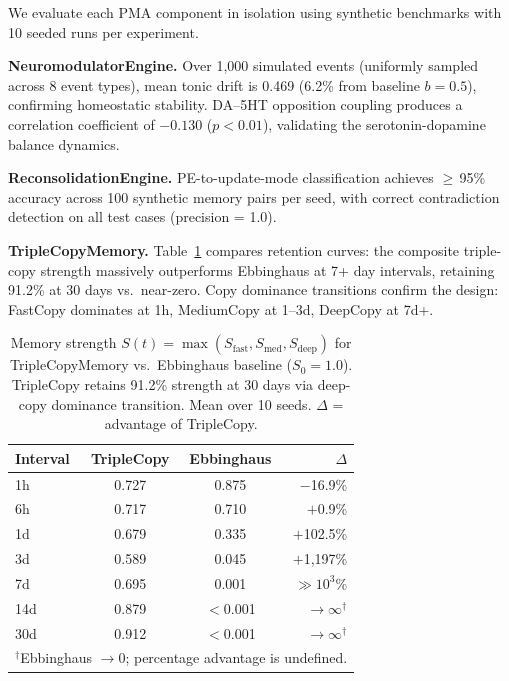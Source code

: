 \documentclass{article}
\begin{document}
We evaluate each PMA component in isolation using synthetic benchmarks
with 10 seeded runs per experiment.

\textbf{NeuromodulatorEngine.}
Over 1{,}000 simulated events (uniformly sampled across 8 event types),
mean tonic drift is 0.469 (6.2\% from baseline $b = 0.5$),
confirming homeostatic stability.
DA--5HT opposition coupling produces a correlation coefficient of $-0.130$
($p < 0.01$), validating the serotonin-dopamine balance dynamics.

\textbf{ReconsolidationEngine.}
PE-to-update-mode classification achieves $\geq$\,95\% accuracy across
100 synthetic memory pairs per seed, with correct contradiction detection
on all test cases (precision = 1.0).

\textbf{TripleCopyMemory.}
Table~\ref{tab:retention-pma} compares retention curves:
the composite triple-copy strength massively outperforms Ebbinghaus
at 7+ day intervals, retaining 91.2\% at 30 days vs.\ near-zero.
Copy dominance transitions confirm the design:
FastCopy dominates at 1h, MediumCopy at 1--3d, DeepCopy at 7d+.

\begin{table}[h]
    \caption{Memory strength $S(t) = \max(S_{\text{fast}}, S_{\text{med}}, S_{\text{deep}})$
    for TripleCopyMemory vs.\ Ebbinghaus baseline ($S_0 = 1.0$).
    TripleCopy retains 91.2\% strength at 30 days via deep-copy dominance transition.
    Mean over 10 seeds. $\Delta$ = advantage of TripleCopy.}
    \label{tab:retention-pma}
    \centering
    \begin{tabular}{lccr}
        \toprule
        Interval & TripleCopy & Ebbinghaus & $\Delta$ \\
        \midrule
        1h  & 0.727 & 0.875 & $-$16.9\% \\
        6h  & 0.717 & 0.710 & $+$0.9\% \\
        1d  & 0.679 & 0.335 & $+$102.5\% \\
        3d  & 0.589 & 0.045 & $+$1{,}197\% \\
        7d  & 0.695 & 0.001 & $\gg 10^3$\% \\
        14d & 0.879 & $<$0.001 & $\to\infty^\dagger$ \\
        30d & 0.912 & $<$0.001 & $\to\infty^\dagger$ \\
        \bottomrule
        \multicolumn{4}{l}{\scriptsize $^\dagger$Ebbinghaus $\to 0$; percentage advantage is undefined.}
    \end{tabular}
\end{table}
\end{document}
